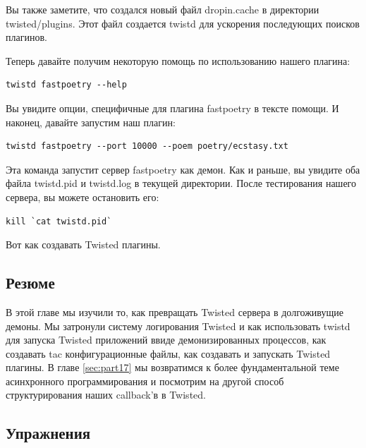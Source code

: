 Вы также заметите, что создался новый файл dropin.cache в 
директории twisted/plugins. Этот файл создается twistd для 
ускорения последующих поисков плагинов.


Теперь давайте получим некоторую помощь по использованию 
нашего плагина:

\begin{scriptsize}\begin{verbatim}
twistd fastpoetry --help
\end{verbatim}\end{scriptsize}


Вы увидите опции, специфичные для плагина fastpoetry в тексте 
помощи. И наконец, давайте запустим наш плагин:

\begin{scriptsize}\begin{verbatim}
twistd fastpoetry --port 10000 --poem poetry/ecstasy.txt
\end{verbatim}\end{scriptsize}


Эта команда запустит сервер fastpoetry как демон. 
Как и раньше,  вы увидите оба файла twistd.pid и 
twistd.log в текущей директории. После тестирования 
нашего сервера, вы можете остановить его:

\begin{scriptsize}\begin{verbatim}
kill `cat twistd.pid`
\end{verbatim}\end{scriptsize}

Вот как создавать Twisted плагины.


\subsection{Резюме}

В этой главе мы изучили то, как превращать 
Twisted сервера в долгоживущие демоны. Мы 
затронули систему логирования Twisted и как 
использовать twistd для запуска Twisted приложений 
ввиде демонизированных процессов, 
как создавать tac конфигурационные файлы,
как создавать и запускать Twisted плагины. 
В главе \ref{sec:part17} мы возвратимся к более фундаментальной 
теме асинхронного программирования и посмотрим 
на другой способ структурирования наших callback'в 
в Twisted. 


\subsection{Упражнения}


